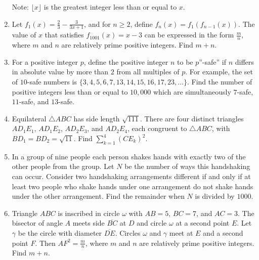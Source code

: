 \documentclass{article}
\begin{document}
\begin{enumerate}[label=\arabic*., itemsep=0.5em]
Note: $\lfloor x \rfloor$ is the greatest integer less than or equal to $x$.\par \vspace{0.5em}\item Let $f_1(x) = \frac23 - \frac3{3x+1}$, and for $n \ge 2$, define $f_n(x) = f_1(f_{n-1}(x))$. The value of $x$ that satisfies $f_{1001}(x) = x-3$ can be expressed in the form $\frac mn$, where $m$ and $n$ are relatively prime positive integers. Find $m+n$.\par \vspace{0.5em}\item For a positive integer $p$, define the positive integer $n$ to be $p$''-safe'' if $n$ differs in absolute value by more than $2$ from all multiples of $p$. For example, the set of $10$-safe numbers is $\{ 3, 4, 5, 6, 7, 13, 14, 15, 16, 17, 23, \ldots\}$. Find the number of positive integers less than or equal to $10,000$ which are simultaneously $7$-safe, $11$-safe, and $13$-safe.\par \vspace{0.5em}\item Equilateral $\triangle ABC$ has side length $\sqrt{111}$. There are four distinct triangles $AD_1E_1$, $AD_1E_2$, $AD_2E_3$, and $AD_2E_4$, each congruent to $\triangle ABC$,
with $BD_1 = BD_2 = \sqrt{11}$. Find $\sum_{k=1}^4(CE_k)^2$.\par \vspace{0.5em}\item In a group of nine people each person shakes hands with exactly two of the other people from the group. Let $N$ be the number of ways this handshaking can occur. Consider two handshaking arrangements different if and only if at least two people who shake hands under one arrangement do not shake hands under the other arrangement. Find the remainder when $N$ is divided by $1000$.\par \vspace{0.5em}\item Triangle $ABC$ is inscribed in circle $\omega$ with $AB=5$, $BC=7$, and $AC=3$. The bisector of angle $A$ meets side $\overline{BC}$ at $D$ and circle $\omega$ at a second point $E$. Let $\gamma$ be the circle with diameter $\overline{DE}$. Circles $\omega$ and $\gamma$ meet at $E$ and a second point $F$. Then $AF^2 = \frac mn$, where $m$ and $n$ are relatively prime positive integers. Find $m+n$.\par \vspace{0.5em}\end{enumerate}
\end{document}

